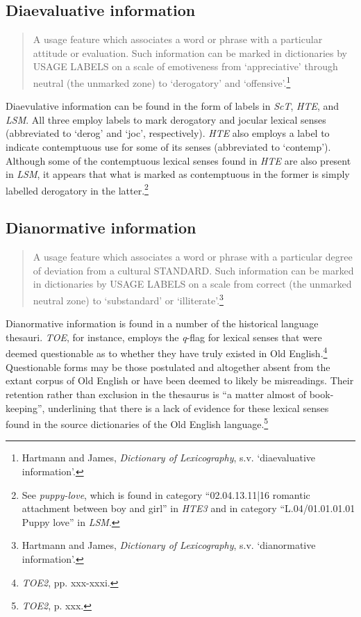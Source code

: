\subsection*{Diaevaluative information}
\begin{quotation} \noindent
A usage feature which associates a word or phrase with a particular attitude or evaluation. Such information can be marked in dictionaries by USAGE LABELS on a scale of emotiveness from `appreciative' through neutral (the unmarked zone) to `derogatory' and `offensive'.\footnote{Hartmann and James, \textit{Dictionary of Lexicography}, s.v. `diaevaluative information'.}
\end{quotation}
Diaevulative information can be found in the form of labels in \textit{ScT}, \textit{HTE}, and \textit{LSM}. All three employ labels to mark derogatory and jocular lexical senses (abbreviated to `derog' and `joc', respectively). \textit{HTE} also employs a label to indicate contemptuous use for some of its senses (abbreviated to `contemp'). Although some of the contemptuous lexical senses found in \textit{HTE} are also present in \textit{LSM}, it appears that what is marked as contemptuous in the former is simply labelled derogatory in the latter.\footnote{See \textit{puppy-love}, which is found in category ``02.04.13.11|16 romantic attachment between boy and girl'' in \textit{HTE3} and in category ``L.04/01.01.01.01 Puppy love'' in \textit{LSM}.}

\subsection*{Dianormative information}
\begin{quotation} \noindent
A usage feature which associates a word or phrase with a particular degree of deviation from a cultural STANDARD. Such information can be marked in dictionaries by USAGE LABELS on a scale from correct (the unmarked neutral zone) to `substandard' or `illiterate'.\footnote{Hartmann and James, \textit{Dictionary of Lexicography}, s.v. `dianormative information'.}
\end{quotation}
Dianormative information is found in a number of the historical language thesauri. \textit{TOE}, for instance, employs the \textit{q}-flag for lexical senses that were deemed questionable as to whether they have truly existed in Old English.\footnote{\textit{TOE2}, pp. xxx-xxxi.} Questionable forms may be those postulated and altogether absent from the extant corpus of Old English or have been deemed to likely be misreadings. Their retention rather than exclusion in the thesaurus is ``a matter almost of book-keeping'', underlining that there is a lack of evidence for these lexical senses found in the source dictionaries of the Old English language.\footnote{\textit{TOE2}, p. xxx.} 

